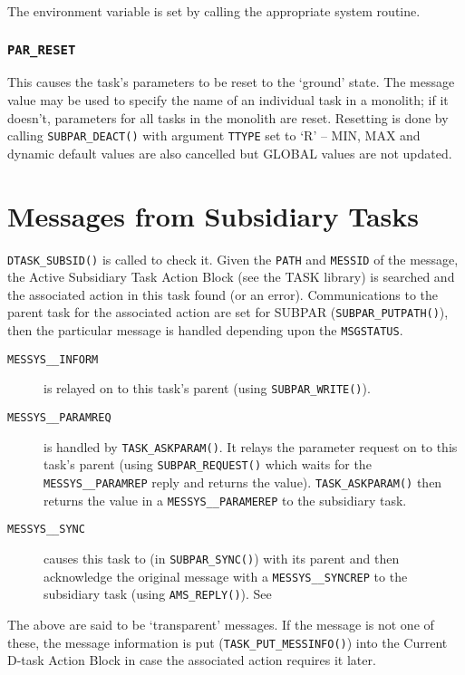 \documentclass[twoside,11pt,nolof]{starlink}
\begin{document}
The environment variable is set by calling the appropriate system routine.

\subsubsection{\texttt{PAR\_RESET}}
This causes the task's parameters to be reset to the `ground' state.
The message value may be used to specify the name of an individual task in a
monolith; if it doesn't, parameters for all tasks in the monolith are reset.
Resetting is done by calling \texttt{SUBPAR\_DEACT()} with argument
\texttt{TTYPE} set to `R' -- MIN, MAX and dynamic default values are also
cancelled but GLOBAL values are not updated.

\section{\label{messages_from_subsidiary_tasks}Messages from Subsidiary Tasks}
\texttt{DTASK\_SUBSID()} is called to check it. Given the \texttt{PATH} and
\texttt{MESSID} of the message, the Active Subsidiary Task Action Block (see
the TASK library) is searched and the associated action in this task found (or
an error).
Communications to the parent task for the associated action are set for
SUBPAR (\texttt{SUBPAR\_PUTPATH()}), then the particular message is handled
depending upon the \texttt{MSGSTATUS}.
\begin{description}
\item[\texttt{MESSYS\_\_INFORM}] is relayed on to this task's parent (using
\texttt{SUBPAR\_WRITE()}).
\item[\texttt{MESSYS\_\_PARAMREQ}] is handled by \texttt{TASK\_ASKPARAM()}.
It relays the parameter request on to this task's parent (using
\texttt{SUBPAR\_REQUEST()} which waits for the \texttt{MESSYS\_\_PARAMREP}
reply and returns the value).
\texttt{TASK\_ASKPARAM()} then returns the value in a
\texttt{MESSYS\_\_PARAMEREP} to the subsidiary task.
\item[\texttt{MESSYS\_\_SYNC}] causes this task to
(in \texttt{SUBPAR\_SYNC()}) with its parent and then acknowledge the original
message with a \texttt{MESSYS\_\_SYNCREP} to the subsidiary task (using
\texttt{AMS\_REPLY()}). See

\end{description}
The above are said to be `transparent' messages. If the message is not
one of these, the message information is put (\texttt{TASK\_PUT\_MESSINFO()})
into the Current D-task Action Block in case the associated action requires it
later.
\end{document}
